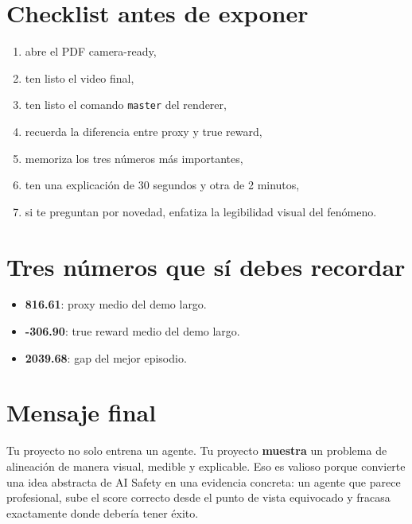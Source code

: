 \documentclass[11pt]{article}
\begin{document}
\section{Checklist antes de exponer}
\begin{enumerate}
    \item abre el PDF camera-ready,
    \item ten listo el video final,
    \item ten listo el comando \texttt{master} del renderer,
    \item recuerda la diferencia entre proxy y true reward,
    \item memoriza los tres números más importantes,
    \item ten una explicación de 30 segundos y otra de 2 minutos,
    \item si te preguntan por novedad, enfatiza la legibilidad visual del fenómeno.
\end{enumerate}

\section{Tres números que sí debes recordar}
\begin{itemize}
    \item \textbf{816.61}: proxy medio del demo largo.
    \item \textbf{-306.90}: true reward medio del demo largo.
    \item \textbf{2039.68}: gap del mejor episodio.
\end{itemize}

\section{Mensaje final}
Tu proyecto no solo entrena un agente. Tu proyecto \textbf{muestra} un problema de alineación de manera visual, medible y explicable. Eso es valioso porque convierte una idea abstracta de AI Safety en una evidencia concreta: un agente que parece profesional, sube el score correcto desde el punto de vista equivocado y fracasa exactamente donde debería tener éxito.
\end{document}
